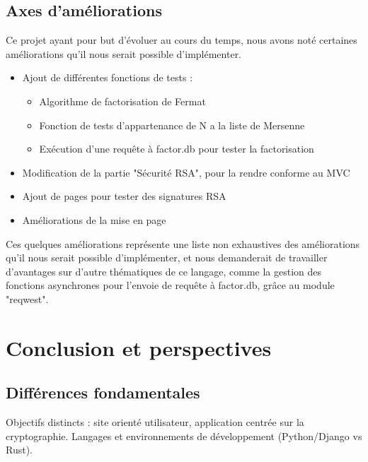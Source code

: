 \documentclass[12pt]{article} %
\begin{document}
	
	\subsection{Axes d'améliorations}

		Ce projet ayant pour but d'évoluer au cours du temps, nous avons noté certaines améliorations qu'il nous serait possible d'implémenter. 
		
		\begin{itemize}
			\item Ajout de différentes fonctions de tests :
			\begin{itemize}
				\item Algorithme de factorisation de Fermat
				\item Fonction de tests d'appartenance de N a la liste de Mersenne
				\item Exécution d'une requête à factor.db pour tester la factorisation
			\end{itemize}			
			\item Modification de la partie "Sécurité RSA", pour la rendre conforme au MVC
			\item Ajout de pages pour tester des signatures RSA
			\item Améliorations de la mise en page	
		\end{itemize}
	
		Ces quelques améliorations représente une liste non exhaustives des améliorations qu'il nous serait possible d'implémenter, et nous demanderait de travailler d'avantages sur d'autre thématiques de ce langage, comme la gestion des fonctions asynchrones pour l'envoie de requête à factor.db, grâce au module "reqwest".




























\newpage

\section{Conclusion et perspectives}
	\subsection{Différences fondamentales}
		Objectifs distincts : site orienté utilisateur, application centrée sur la cryptographie.
Langages et environnements de développement (Python/Django vs Rust).
\end{document}
